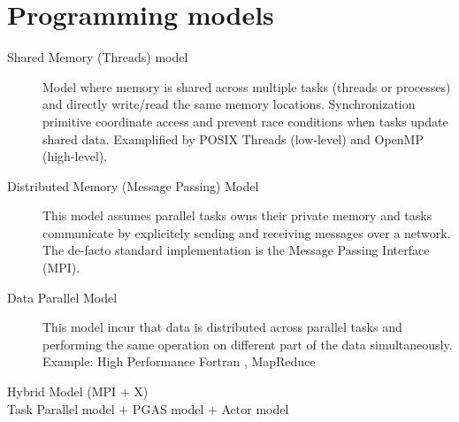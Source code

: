 \section{Programming models}

\begin{description}
\item [Shared Memory (Threads) model] Model where memory is shared across multiple tasks (threads or processes) and directly write/read the same memory locations. Synchronization primitive coordinate access and prevent race conditions when tasks update shared data. Examplified by POSIX Threads (low-level) and OpenMP (high-level).

\item [Distributed Memory (Message Passing) Model] This model assumes parallel tasks owns their private memory and tasks communicate by explicitely sending and receiving messages over a network. The de-facto standard implementation is the Message Passing Interface (MPI).  

\item [Data Parallel Model] This model incur that data is distributed across parallel tasks and performing the same operation on different part of the data simultaneously. Example: High Performance Fortran , MapReduce

\item [Hybrid Model (MPI + X)]

\item[Task Parallel model + PGAS model + Actor model ] 

\end{description}





